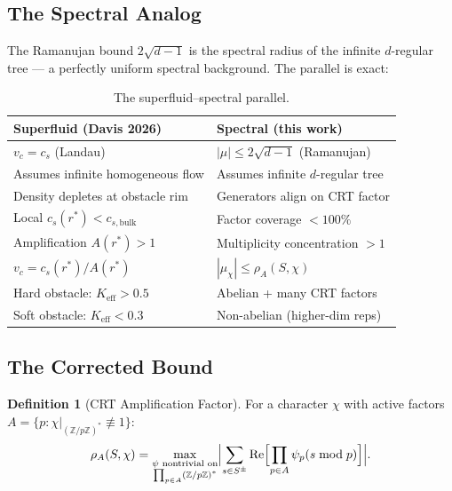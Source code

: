 \documentclass[12pt,reqno]{amsart}
\theoremstyle{plain}
\theoremstyle{definition}
\newtheorem{definition}[theorem]{Definition}
\theoremstyle{remark}
\newcommand{\ZZ}{\mathbb{Z}}
\begin{document}
\subsection{The Spectral Analog}

The Ramanujan bound $2\sqrt{d-1}$ is the spectral radius of the
infinite $d$-regular tree --- a perfectly uniform spectral background.
The parallel is exact:

\begin{table}[h]
\centering
\renewcommand{\arraystretch}{1.2}
\begin{tabular}{ll}
  \toprule
  Superfluid (Davis 2026) & Spectral (this work) \\
  \midrule
  $v_c = c_s$ (Landau)
  & $|\mu| \leq 2\sqrt{d-1}$ (Ramanujan) \\
  Assumes infinite homogeneous flow
  & Assumes infinite $d$-regular tree \\
  Density depletes at obstacle rim
  & Generators align on CRT factor \\
  Local $c_s(r^*) < c_{s,\mathrm{bulk}}$
  & Factor coverage $< 100\%$ \\
  Amplification $A(r^*) > 1$
  & Multiplicity concentration $> 1$ \\
  $v_c = c_s(r^*)/A(r^*)$
  & $|\mu_\chi| \leq \rho_A(S,\chi)$ \\
  Hard obstacle: $K_{\mathrm{eff}} > 0.5$
  & Abelian + many CRT factors \\
  Soft obstacle: $K_{\mathrm{eff}} < 0.3$
  & Non-abelian (higher-dim reps) \\
  \bottomrule
\end{tabular}
\caption{The superfluid--spectral parallel.}
\label{tab:parallel}
\end{table}

\subsection{The Corrected Bound}

\begin{definition}[CRT Amplification Factor]
  For a character $\chi$ with active factors
  $A = \{p : \chi|_{(\ZZ/p\ZZ)^*} \not\equiv 1\}$:
  \[
    \rho_A(S,\chi) = \max_{\substack{\psi \text{ nontrivial on}\\
    \prod_{p \in A} (\ZZ/p\ZZ)^*}}
    \Bigl|\sum_{s \in S^\pm} \operatorname{Re}
    \Bigl[\prod_{p \in A} \psi_p(s \bmod p)\Bigr]\Bigr|.
  \]
\end{definition}
\end{document}
